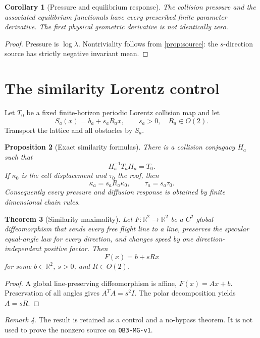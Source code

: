 \documentclass[11pt,reqno]{amsart}
\newtheorem{theorem}{Theorem}[section]
\newtheorem{proposition}[theorem]{Proposition}
\newtheorem{corollary}[theorem]{Corollary}
\theoremstyle{definition}
\theoremstyle{remark}
\newtheorem{remark}[theorem]{Remark}
\newcommand{\R}{\mathbb R}
\begin{document}
\begin{corollary}[Pressure and equilibrium response]\label{cor:pressure}
The collision pressure and the associated equilibrium functionals have every
prescribed finite parameter derivative.  The first physical geometric
derivative is not identically zero.
\end{corollary}

\begin{proof}
Pressure is $\log\lambda$.  Nontriviality follows from
\cref{prop:source}: the $s$-direction source has strictly negative invariant
mean.
\end{proof}

\section{The similarity Lorentz control}\label{sec:similarity}

Let $T_0$ be a fixed finite-horizon periodic Lorentz collision map and let
\[
 S_a(x)=b_a+s_aR_ax,\qquad s_a>0,\quad R_a\in O(2).
\]
Transport the lattice and all obstacles by $S_a$.

\begin{proposition}[Exact similarity formulas]\label{prop:similarity}
There is a collision conjugacy $H_a$ such that
\[
 H_a^{-1}T_aH_a=T_0.
\]
If $\kappa_0$ is the cell displacement and $\tau_0$ the roof, then
\[
 \kappa_a=s_aR_a\kappa_0,\qquad
 \tau_a=s_a\tau_0.
\]
Consequently every pressure and diffusion response is obtained by finite
dimensional chain rules.
\end{proposition}

\begin{theorem}[Similarity maximality]\label{thm:similarity-maximality}
Let $F:\R^2\to\R^2$ be a $C^2$ global diffeomorphism that sends every free
flight line to a line, preserves the specular equal-angle law for every
direction, and changes speed by one direction-independent positive factor.
Then
\[
 F(x)=b+sRx
\]
for some $b\in\R^2$, $s>0$, and $R\in O(2)$.
\end{theorem}

\begin{proof}
A global line-preserving diffeomorphism is affine, $F(x)=Ax+b$.  Preservation
of all angles gives $A^TA=s^2I$.  The polar decomposition yields $A=sR$.
\end{proof}

\begin{remark}
The result is retained as a control and a no-bypass theorem.  It is not used to
prove the nonzero source on \texttt{OB3-MG-v1}.
\end{remark}
\end{document}
